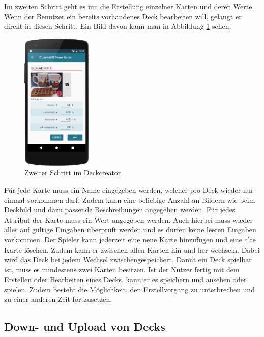 Im zweiten Schritt geht es um die Erstellung einzelner Karten und deren Werte. Wenn der Benutzer ein bereits vorhandenes Deck bearbeiten will, gelangt er direkt in diesen Schritt. Ein Bild davon kann man in Abbildung \ref{figure:implementierungdeckeditor} sehen.\\

\begin{figure}[htp]
	\centering
  	\includegraphics[width=0.3\textwidth]{img/screenshots/device_new_card.png}
	\caption{Zweiter Schritt im Deckcreator}
	\label{figure:implementierungdeckeditor}
\end{figure}

Für jede Karte muss ein Name eingegeben werden, welcher pro Deck wieder nur einmal vorkommen darf. Zudem kann eine beliebige Anzahl an Bildern wie beim Deckbild und dazu passende Beschreibungen angegeben werden. Für jedes Attribut der Karte muss ein Wert angegeben werden. Auch hierbei muss wieder alles auf gültige Eingaben überprüft werden und es dürfen keine leeren Eingaben vorkommen. Der Spieler kann jederzeit eine neue Karte hinzufügen und eine alte Karte löschen. Zudem kann er zwischen allen Karten hin und her wechseln. Dabei wird das Deck bei jedem Wechsel zwischengespeichert. Damit ein Deck spielbar ist, muss es mindestens zwei Karten besitzen. Ist der Nutzer fertig mit dem Erstellen oder Bearbeiten eines Decks, kann er es speichern und ansehen oder spielen. Zudem besteht die Möglichkeit, den Erstellvorgang zu unterbrechen und zu einer anderen Zeit fortzusetzen.

\subsection{Down- und Upload von Decks}
\label{sec:implementierung:besonderheiten:deckdownload }

